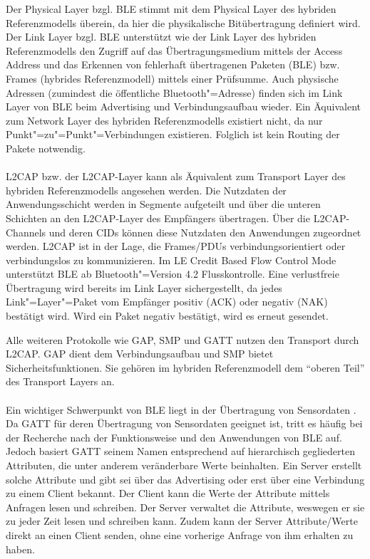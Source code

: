 Der Physical Layer bzgl. BLE stimmt mit dem Physical Layer des hybriden Referenzmodells überein, da hier die physikalische Bitübertragung definiert wird. Der Link Layer bzgl. BLE unterstützt wie der Link Layer des hybriden Referenzmodells den Zugriff auf das Übertragungsmedium mittels der Access Address und das Erkennen von fehlerhaft übertragenen Paketen (BLE) bzw. Frames (hybrides Referenzmodell) mittels einer Prüfsumme. Auch physische Adressen (zumindest die öffentliche Bluetooth"=Adresse) finden sich im Link Layer von BLE beim Advertising und Verbindungsaufbau wieder. Ein Äquivalent zum Network Layer des hybriden Referenzmodells existiert nicht, da nur Punkt"=zu"=Punkt"=Verbindungen existieren. Folglich ist kein Routing der Pakete notwendig.
\\\\
L2CAP bzw. der L2CAP-Layer kann als Äquivalent zum Transport Layer des hybriden Referenzmodells angesehen werden. Die Nutzdaten der Anwendungsschicht werden in Segmente aufgeteilt und über die unteren Schichten an den L2CAP-Layer des Empfängers übertragen. Über die L2CAP-Channels und deren CIDs können diese Nutzdaten den Anwendungen zugeordnet werden. L2CAP ist in der Lage, die Frames/PDUs verbindungsorientiert oder verbindungslos zu kommunizieren. Im LE Credit Based Flow Control Mode unterstützt BLE ab Bluetooth"=Version 4.2 Flusskontrolle. Eine verlustfreie Übertragung wird bereits im Link Layer sichergestellt, da jedes Link"=Layer"=Paket vom Empfänger positiv (ACK) oder negativ (NAK) bestätigt wird. Wird ein Paket negativ bestätigt, wird es erneut gesendet.

Alle weiteren Protokolle wie GAP, SMP und GATT nutzen den Transport durch L2CAP. GAP dient dem Verbindungsaufbau und SMP bietet Sicherheitsfunktionen. Sie gehören im hybriden Referenzmodell dem "`oberen Teil"' des Transport Layers an.
\\\\
Ein wichtiger Schwerpunkt von BLE liegt in der Übertragung von Sensordaten \cite{BtDataTransfer}. Da GATT für deren Übertragung von Sensordaten geeignet ist, tritt es häufig bei der Recherche nach der Funktionsweise und den Anwendungen von BLE auf. Jedoch basiert GATT seinem Namen entsprechend auf hierarchisch gegliederten Attributen, die unter anderem veränderbare Werte beinhalten. Ein Server erstellt solche Attribute und gibt sei über das Advertising oder erst über eine Verbindung zu einem Client bekannt. Der Client kann die Werte der Attribute mittels Anfragen lesen und schreiben. Der Server verwaltet die Attribute, weswegen er sie zu jeder Zeit lesen und schreiben kann. Zudem kann der Server Attribute/Werte direkt an einen Client senden, ohne eine vorherige Anfrage von ihm erhalten zu haben. 

